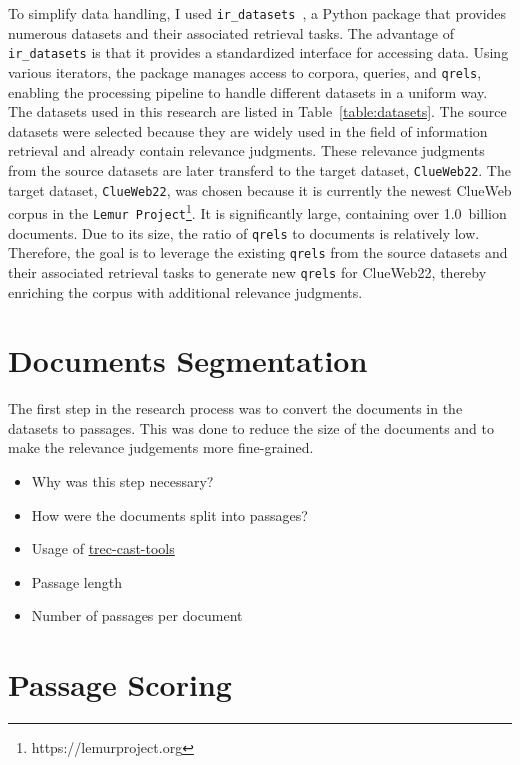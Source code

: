 To simplify data handling, I used \texttt{ir\_datasets}~\citep{macavaney:2021}, a Python package that provides numerous datasets and their associated retrieval tasks. The advantage of \texttt{ir\_datasets} is that it provides a standardized interface for accessing data. Using various iterators, the package manages access to corpora, queries, and \texttt{qrels}, enabling the processing pipeline to handle different datasets in a uniform way. The datasets used in this research are listed in Table~\ref{table:datasets}. The source datasets were selected because they are widely used in the field of information retrieval and already contain relevance judgments. These relevance judgments from the source datasets are later transferd to the target dataset, \texttt{ClueWeb22}. The target dataset, \texttt{ClueWeb22}, was chosen because it is currently the newest ClueWeb corpus in the \texttt{Lemur Project}\footnote{https://lemurproject.org}. It is significantly large, containing over 1.0~billion documents. Due to its size, the ratio of \texttt{qrels} to documents is relatively low. Therefore, the goal is to leverage the existing \texttt{qrels} from the source datasets and their associated retrieval tasks to generate new \texttt{qrels} for ClueWeb22, thereby enriching the corpus with additional relevance judgments. 

\section{Documents Segmentation}\label{document-segmentation}

The first step in the research process was to convert the documents in the datasets to passages. This was done to reduce the size of the documents and to make the relevance judgements more fine-grained.

\begin{itemize}
    \item Why was this step necessary?
    \item How were the documents split into passages?
    \item Usage of \href{https://github.com/grill-lab/trec-cast-tools/tree/master/corpus_processing/passage_chunkers}{trec-cast-tools}
    \item Passage length
    \item Number of passages per document
\end{itemize}

\section{Passage Scoring}\label{passage-scoring}

